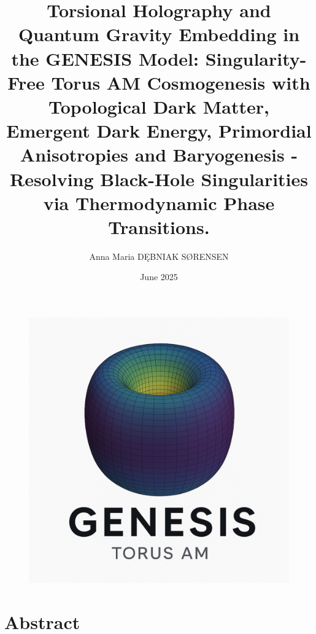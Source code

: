 \documentclass{article}
\title{Torsional Holography and Quantum Gravity Embedding in the GENESIS Model: Singularity-Free Torus AM Cosmogenesis with Topological Dark Matter, Emergent Dark Energy, Primordial Anisotropies and Baryogenesis - Resolving Black-Hole Singularities via Thermodynamic Phase Transitions.}
\author{Anna Maria DĘBNIAK SØRENSEN}
\date{June 2025}
\begin{document}
\begin{figure}
    \centering
    \includegraphics[width=0.5\linewidth]{TorusAM.png}
\end{figure}



\maketitle
\clearpage

\section{Abstract}


\end{document}

